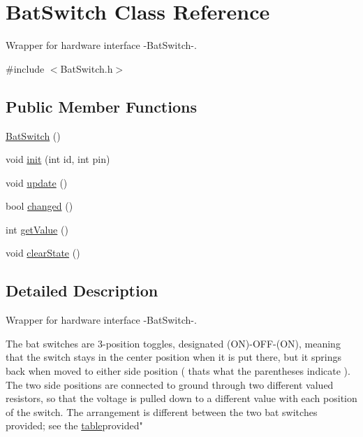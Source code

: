 \hypertarget{class_bat_switch}{}\section{Bat\+Switch Class Reference}
\label{class_bat_switch}


Wrapper for hardware interface -\/\+Bat\+Switch-\/.  




{\ttfamily \#include $<$Bat\+Switch.\+h$>$}

\subsection*{Public Member Functions}
\begin{DoxyCompactItemize}
\item 
\mbox{\hyperlink{class_bat_switch_a77fa7a6d672398db8e44939ee1bce610}{Bat\+Switch}} ()
\item 
void \mbox{\hyperlink{class_bat_switch_a144b8789518472a4d5dc19f09968148e}{init}} (int id, int pin)
\item 
void \mbox{\hyperlink{class_bat_switch_ac22ba354f82cc1c0e2e8d6876305ea66}{update}} ()
\item 
bool \mbox{\hyperlink{class_bat_switch_a4213173651fbb8c7fdcef12799318da4}{changed}} ()
\item 
int \mbox{\hyperlink{class_bat_switch_a2a41a055ec34dbc7169f3b2161e84075}{get\+Value}} ()
\item 
void \mbox{\hyperlink{class_bat_switch_af2180338890cebe52ff16427361383bd}{clear\+State}} ()
\end{DoxyCompactItemize}


\subsection{Detailed Description}
Wrapper for hardware interface -\/\+Bat\+Switch-\/. 

The bat switches are 3-\/position toggles, designated (ON)-\/\+O\+F\+F-\/(ON), meaning that the switch stays in the center position when it is put there, but it springs back when moved to either side position ( that\textquotesingle{}s what the parentheses indicate ). The two side positions are connected to ground through two different valued resistors, so that the voltage is pulled down to a different value with each position of the switch. The arrangement is different between the two bat switches provided; see the \mbox{\hyperlink{_open_effects_box_h_w_8h}{table}}provided" 

